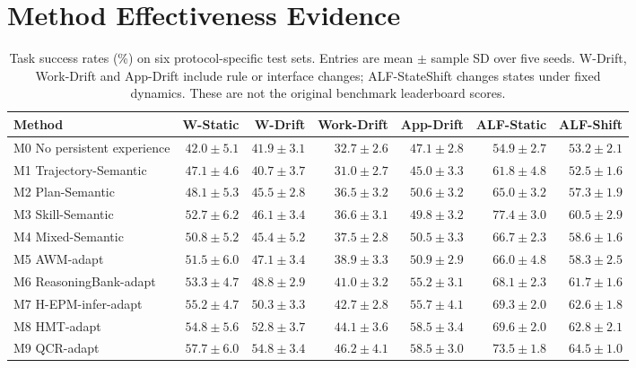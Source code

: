\documentclass[sigconf,anonymous,review]{acmart}
\theoremstyle{zhplain}
\begin{document}
\section{Method Effectiveness Evidence}
\label{sec:results}
\begin{table}[t]
\centering
\caption{Task success rates (\%) on six protocol-specific test sets. Entries are mean \(\pm\) sample SD over five seeds. W-Drift, Work-Drift and App-Drift include rule or interface changes; ALF-StateShift changes states under fixed dynamics. These are not the original benchmark leaderboard scores.}
\label{tab:main}
\small
\begin{tabular}{@{}lrrrrrr@{}}
\toprule
Method & W-Static & W-Drift & Work-Drift & App-Drift & ALF-Static & ALF-Shift \\
\midrule
M0 No persistent experience & \(42.0\!\pm\!5.1\) & \(41.9\!\pm\!3.1\) & \(32.7\!\pm\!2.6\) & \(47.1\!\pm\!2.8\) & \(54.9\!\pm\!2.7\) & \(53.2\!\pm\!2.1\) \\
M1 Trajectory-Semantic & \(47.1\!\pm\!4.6\) & \(40.7\!\pm\!3.7\) & \(31.0\!\pm\!2.7\) & \(45.0\!\pm\!3.3\) & \(61.8\!\pm\!4.8\) & \(52.5\!\pm\!1.6\) \\
M2 Plan-Semantic & \(48.1\!\pm\!5.3\) & \(45.5\!\pm\!2.8\) & \(36.5\!\pm\!3.2\) & \(50.6\!\pm\!3.2\) & \(65.0\!\pm\!3.2\) & \(57.3\!\pm\!1.9\) \\
M3 Skill-Semantic & \(52.7\!\pm\!6.2\) & \(46.1\!\pm\!3.4\) & \(36.6\!\pm\!3.1\) & \(49.8\!\pm\!3.2\) & \(77.4\!\pm\!3.0\) & \(60.5\!\pm\!2.9\) \\
M4 Mixed-Semantic & \(50.8\!\pm\!5.2\) & \(45.4\!\pm\!5.2\) & \(37.5\!\pm\!2.8\) & \(50.5\!\pm\!3.3\) & \(66.7\!\pm\!2.3\) & \(58.6\!\pm\!1.6\) \\
M5 AWM-adapt & \(51.5\!\pm\!6.0\) & \(47.1\!\pm\!3.4\) & \(38.9\!\pm\!3.3\) & \(50.9\!\pm\!2.9\) & \(66.0\!\pm\!4.8\) & \(58.3\!\pm\!2.5\) \\
M6 ReasoningBank-adapt & \(53.3\!\pm\!4.7\) & \(48.8\!\pm\!2.9\) & \(41.0\!\pm\!3.2\) & \(55.2\!\pm\!3.1\) & \(68.1\!\pm\!2.3\) & \(61.7\!\pm\!1.6\) \\
M7 H-EPM-infer-adapt & \(55.2\!\pm\!4.7\) & \(50.3\!\pm\!3.3\) & \(42.7\!\pm\!2.8\) & \(55.7\!\pm\!4.1\) & \(69.3\!\pm\!2.0\) & \(62.6\!\pm\!1.8\) \\
M8 HMT-adapt & \(54.8\!\pm\!5.6\) & \(52.8\!\pm\!3.7\) & \(44.1\!\pm\!3.6\) & \(58.5\!\pm\!3.4\) & \(69.6\!\pm\!2.0\) & \(62.8\!\pm\!2.1\) \\
M9 QCR-adapt & \(57.7\!\pm\!6.0\) & \(54.8\!\pm\!3.4\) & \(46.2\!\pm\!4.1\) & \(58.5\!\pm\!3.0\) & \(73.5\!\pm\!1.8\) & \(64.5\!\pm\!1.0\) \\

\end{tabular}
\end{table}
\end{document}
